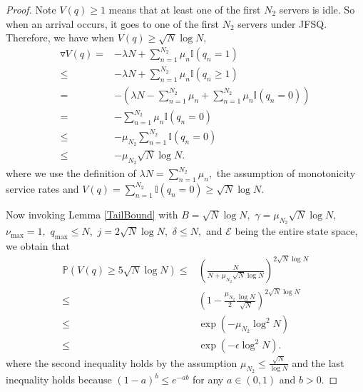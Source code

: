 \documentclass[11pt,oneside,letter]{article}
\begin{document}
\mostntwo*
\begin{proof}
Note $V(q)\geq 1$ means that at least one of the first $N_2$ servers is idle.  So when an arrival occurs, it goes to one of the first $N_2$ servers under JFSQ. Therefore, we have when $V(q)\geq \sqrt{N}\log N,$
\begin{align*}
\triangledown V(q) = & -\lambda N + \sum_{n=1}^{N_2}\mu_n \mathbb{I}(q_n = 1)\\
\leq & -\lambda N + \sum_{n=1}^{N_2}\mu_n \mathbb{I}(q_n\geq 1)\\
=& -\left(\lambda N -\sum_{n=1}^{N_2}\mu_n +\sum_{n=1}^{N_2}\mu_n \mathbb{I}(q_n=0)\right)\\
= & - \sum_{n=1}^{N_2}\mu_n \mathbb{I}(q_n=0)\\
\leq & - \mu_{N_2} \sum_{n=1}^{N_2} \mathbb{I}(q_n=0)\\
\leq & -\mu_{N_2} \sqrt{N} \log N.
\end{align*} 
where we use the definition of $\lambda N = \sum_{n=1}^{N_2}\mu_n,$ the assumption of monotonicity service rates and $V(q)=\sum_{n=1}^{N_2}\mathbb{I}(q_n=0) \geq \sqrt{N}\log N.$   

Now invoking Lemma \ref{TailBound} with $B=\sqrt{N}{\log N},$ $\gamma=\mu_{N_2} \sqrt{N} \log N,$ $\nu_{\max}=1,$ $q_{\max}\leq N,$ $j=2\sqrt{N} \log N,$ $\delta\leq N,$ and $\mathcal E$ being the entire state space, we obtain that 
\begin{align*}
  \mathbb P\left(V(q)\geq 5\sqrt{N} \log N \right)
   \leq & \left(\frac{N}{N+\mu_{N_2}{\sqrt{N}}\log N}\right)^{2\sqrt{N} \log N}\\ 
   \leq &\left(1- \frac{\mu_{N_2}}{2} \frac{\log N}{\sqrt{N}}\right)^{2\sqrt{N} \log N}\\
   \leq &\exp\left(-\mu_{N_2}\log^2 N\right)\\
   \leq &\exp\left(-\epsilon\log^2 N\right).
\end{align*} 
where the second inequality holds by the assumption $\mu_{N_2} \leq \frac{\sqrt{N}}{\log N}$ and the last inequality holds because $(1-a)^b\leq e^{-ab}$ for any $a\in (0,1)$ and $b>0.$
\end{proof}
\end{document}
